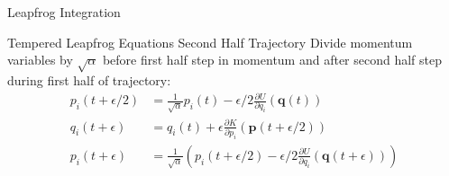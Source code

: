 \documentclass{beamer}
\begin{document}
\begin{frame}{Leapfrog Integration}
    {
        \begin{block}{Tempered Leapfrog Equations Second Half Trajectory}
        Divide momentum variables by $\sqrt{\alpha}$ before first half step in momentum and after second half step during first half of trajectory:
            \begin{align*}
                p_i\left(t+\epsilon/2\right) & = \frac{1}{\sqrt{\alpha}}p_i\left(t\right) - \epsilon/2\frac{\partial U}{\partial q_i}\left(\bm{q}\left(t\right)\right) \\
                q_i\left(t+\epsilon\right) & = q_i\left(t\right) + \epsilon\frac{\partial K}{\partial p_i}\left(\bm{p}\left(t+\epsilon/2\right)\right) \\
                p_i\left(t+\epsilon\right) & = \frac{1}{\sqrt{\alpha}}\left(p_i\left(t+\epsilon/2\right) - \epsilon/2\frac{\partial U}{\partial q_i}\left(\bm{q}\left(t+\epsilon\right)\right)\right)
            \end{align*}
        \end{block}
    }
\end{frame}
\end{document}
